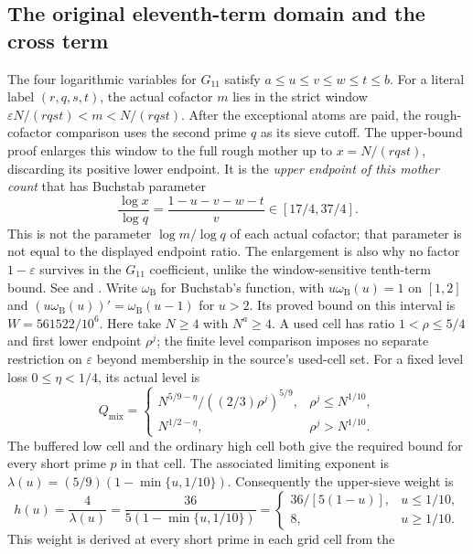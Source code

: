 \subsection{The original eleventh-term domain and the cross term}
The four logarithmic variables for $G_{11}$ satisfy
$a\le u\le v\le w\le t\le b$.
For a literal label $(r,q,s,t)$, the actual cofactor $m$ lies in the
strict window $\varepsilon N/(rqst)<m<N/(rqst)$.  After the exceptional
atoms are paid, the rough-cofactor comparison uses the second prime $q$
as its sieve cutoff.  The upper-bound proof enlarges this window to
the full rough mother up to $x=N/(rqst)$, discarding its positive lower
endpoint.  It is the \emph{upper endpoint of this mother count} that has
Buchstab parameter
\[
 \frac{\log x}{\log q}=\frac{1-u-v-w-t}{v}\in[17/4,37/4].
\]
This is not the parameter $\log m/\log q$ of each actual cofactor;
that parameter is not equal to the displayed endpoint ratio.
The enlargement is also why no factor $1-\varepsilon$ survives in
the $G_{11}$ coefficient, unlike the window-sensitive tenth-term bound.
See 
and .
Write $\omega_{\mathrm B}$ for Buchstab's function,
with $u\omega_{\mathrm B}(u)=1$ on $[1,2]$ and $(u\omega_{\mathrm B}(u))'=\omega_{\mathrm B}(u-1)$ for $u>2$.
Its proved bound on this interval is $W=561522/10^6$.
Here take $N\ge4$ with $N^a\ge4$.  A used cell has ratio
$1<\rho\le5/4$ and first lower endpoint $\rho^j$;
the finite level comparison imposes no separate restriction on
$\varepsilon$ beyond membership in the source's used-cell set.
For a fixed level loss $0\le\eta<1/4$, its actual level is
\[
 Q_{\mathrm{mix}}=\begin{cases}
 N^{5/9-\eta}/((2/3)\rho^j)^{5/9},&\rho^j\le N^{1/10},\\
 N^{1/2-\eta},&\rho^j>N^{1/10}.
 \end{cases}
\]
The buffered low cell and the ordinary high cell both give the required
bound for every short prime $p$ in that cell. The associated limiting exponent is
$\lambda(u)=(5/9)(1-\min\{u,1/10\})$.
Consequently the upper-sieve weight is
\[
 h(u)=\frac4{\lambda(u)}=\frac{36}{5(1-\min\{u,1/10\})}
 =\begin{cases}36/[5(1-u)],&u\le1/10,\\8,&u\ge1/10.\end{cases}
\]
This weight is derived at every short prime in each grid cell from the

